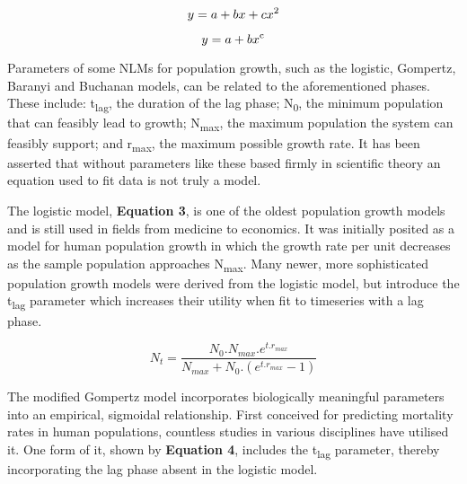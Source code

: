 \documentclass[11pt]{article}
\begin{document}
\begin{equation}
    y = a + bx + cx\textsuperscript{2}
\end{equation}

\begin{equation}
    y = a + bx\textsuperscript{c}
\end{equation}
\vspace{2mm}

Parameters of some NLMs for population growth, such as the logistic, Gompertz, Baranyi and Buchanan models, can be related to the aforementioned phases. These include: t\textsubscript{lag}, the duration of the lag phase; N\textsubscript{0}, the minimum population that can feasibly lead to growth; N\textsubscript{max}, the maximum population the system can feasibly support; and r\textsubscript{max}, the maximum possible growth rate.\parencite{Micha2011} It has been asserted that without parameters like these based firmly in scientific theory an equation used to fit data is not truly a model.\parencite{Buchanan1997}

  

The logistic model, \textbf{Equation 3}, is one of the oldest population growth models and is still used in fields from medicine to economics. It was initially posited as a model for human population growth in which the growth rate per unit decreases as the sample population approaches N\textsubscript{max}.\parencite{Peleg1997} Many newer, more sophisticated population growth models were derived from the logistic model, but introduce the t\textsubscript{lag} parameter which increases their utility when fit to timeseries with a lag phase.

\begin{equation}
    N_{t} = \frac{ N_{0} . N_{max} . e^{t . r_{max}}      }
                 { N_{max} + N_{0} . (e^{t . r_{max}} - 1)}
\end{equation}
\vspace{3mm}



The modified Gompertz model incorporates biologically meaningful parameters into an empirical, sigmoidal relationship.\parencite{Tjørve2017, Buchanan1997} First conceived for predicting mortality rates in human populations, countless studies in various disciplines have utilised it.\parencite{Tjørve2017, Buchanan1997, Mokhtari2019, Peleg1997} One form of it, shown by \textbf{Equation 4}, includes the t\textsubscript{lag} parameter, thereby incorporating the lag phase absent in the logistic model.\parencite{Zwietering1990,Buchanan1997}
\end{document}
